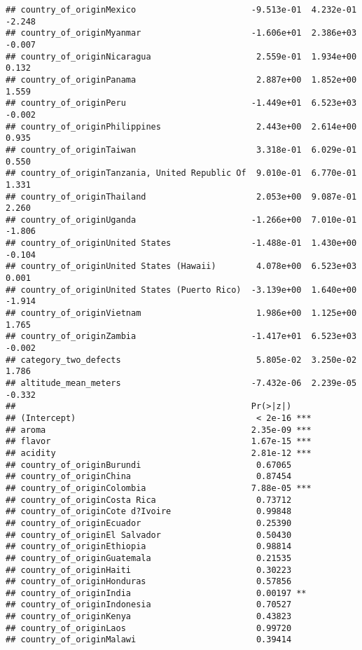 \documentclass[
]{article}
\begin{document}
\begin{verbatim}
## country_of_originMexico                       -9.513e-01  4.232e-01  -2.248
## country_of_originMyanmar                      -1.606e+01  2.386e+03  -0.007
## country_of_originNicaragua                     2.559e-01  1.934e+00   0.132
## country_of_originPanama                        2.887e+00  1.852e+00   1.559
## country_of_originPeru                         -1.449e+01  6.523e+03  -0.002
## country_of_originPhilippines                   2.443e+00  2.614e+00   0.935
## country_of_originTaiwan                        3.318e-01  6.029e-01   0.550
## country_of_originTanzania, United Republic Of  9.010e-01  6.770e-01   1.331
## country_of_originThailand                      2.053e+00  9.087e-01   2.260
## country_of_originUganda                       -1.266e+00  7.010e-01  -1.806
## country_of_originUnited States                -1.488e-01  1.430e+00  -0.104
## country_of_originUnited States (Hawaii)        4.078e+00  6.523e+03   0.001
## country_of_originUnited States (Puerto Rico)  -3.139e+00  1.640e+00  -1.914
## country_of_originVietnam                       1.986e+00  1.125e+00   1.765
## country_of_originZambia                       -1.417e+01  6.523e+03  -0.002
## category_two_defects                           5.805e-02  3.250e-02   1.786
## altitude_mean_meters                          -7.432e-06  2.239e-05  -0.332
##                                               Pr(>|z|)    
## (Intercept)                                    < 2e-16 ***
## aroma                                         2.35e-09 ***
## flavor                                        1.67e-15 ***
## acidity                                       2.81e-12 ***
## country_of_originBurundi                       0.67065    
## country_of_originChina                         0.87454    
## country_of_originColombia                     7.88e-05 ***
## country_of_originCosta Rica                    0.73712    
## country_of_originCote d?Ivoire                 0.99848    
## country_of_originEcuador                       0.25390    
## country_of_originEl Salvador                   0.50430    
## country_of_originEthiopia                      0.98814    
## country_of_originGuatemala                     0.21535    
## country_of_originHaiti                         0.30223    
## country_of_originHonduras                      0.57856    
## country_of_originIndia                         0.00197 ** 
## country_of_originIndonesia                     0.70527    
## country_of_originKenya                         0.43823    
## country_of_originLaos                          0.99720    
## country_of_originMalawi                        0.39414    

\end{verbatim}
\end{document}
